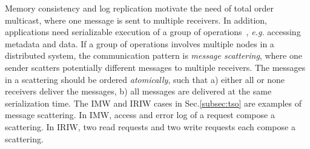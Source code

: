 %


\iffalse
Memory consistency and log replication motivate the need of total order multicast, where one message is sent to multiple receivers.
In addition, applications need serializable execution of a group of operations~\cite{cheriton1994understanding}, \textit{e.g.} accessing metadata and data.
If a group of operations involves multiple nodes in a distributed system, the communication pattern is \textit{message scattering}, where one sender scatters potentially different messages to multiple receivers.
The messages in a scattering should be ordered \textit{atomically}, such that a) either all or none receivers deliver the messages, b) all messages are delivered at the same serialization time.
The IMW and IRIW cases in Sec.\ref{subsec:tso} are examples of  message scattering.
In IMW, access and error log of a request compose a scattering.
In IRIW, two read requests and two write requests each compose a scattering.

